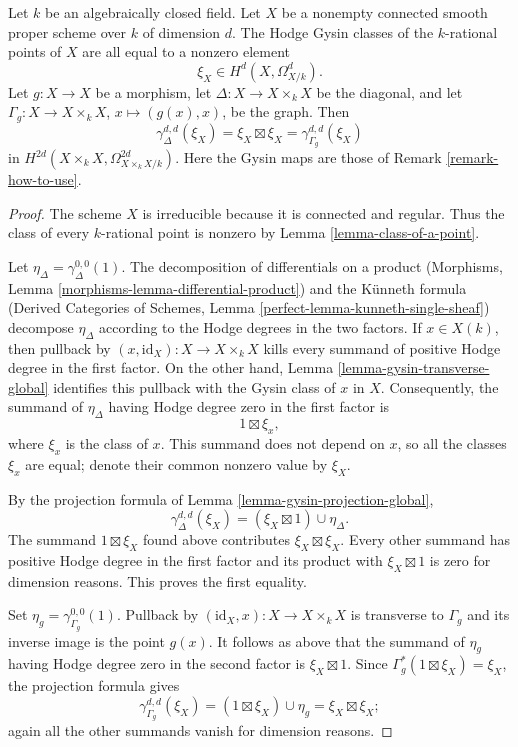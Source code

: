 \begin{lemma}
\label{lemma-hodge-classes-points-diagonal-graph}
Let $k$ be an algebraically closed field. Let $X$ be a nonempty connected
smooth proper scheme over $k$ of dimension $d$. The Hodge Gysin classes
of the $k$-rational points of $X$ are all equal to a nonzero element
$$
\xi_X \in H^d(X, \Omega^d_{X/k}).
$$
Let $g : X \to X$ be a morphism, let
$\Delta : X \to X \times_k X$ be the diagonal, and let
$\Gamma_g : X \to X \times_k X$, $x \mapsto (g(x), x)$, be the graph.
Then
$$
\gamma^{d, d}_\Delta(\xi_X) =
\xi_X \boxtimes \xi_X =
\gamma^{d, d}_{\Gamma_g}(\xi_X)
$$
in $H^{2d}(X \times_k X, \Omega^{2d}_{X \times_k X/k})$.
Here the Gysin maps are those of Remark \ref{remark-how-to-use}.
\end{lemma}

\begin{proof}
The scheme $X$ is irreducible because it is connected and regular. Thus
the class of every $k$-rational point is nonzero by
Lemma \ref{lemma-class-of-a-point}.

\medskip\noindent
Let $\eta_\Delta = \gamma^{0, 0}_\Delta(1)$. The decomposition of
differentials on a product
(Morphisms, Lemma \ref{morphisms-lemma-differential-product}) and the
K\"unneth formula (Derived Categories of Schemes, Lemma
\ref{perfect-lemma-kunneth-single-sheaf}) decompose $\eta_\Delta$ according
to the Hodge degrees in the two factors. If $x \in X(k)$, then
pullback by $(x, \text{id}_X) : X \to X \times_k X$ kills every summand
of positive Hodge degree in the first factor. On the other hand,
Lemma \ref{lemma-gysin-transverse-global} identifies this pullback with
the Gysin class of $x$ in $X$. Consequently, the summand of
$\eta_\Delta$ having Hodge degree zero in the first factor is
$$
1 \boxtimes \xi_x,
$$
where $\xi_x$ is the class of $x$. This summand does not depend on $x$,
so all the classes $\xi_x$ are equal; denote their common nonzero value
by $\xi_X$.

\medskip\noindent
By the projection formula of
Lemma \ref{lemma-gysin-projection-global},
$$
\gamma^{d, d}_\Delta(\xi_X) =
(\xi_X \boxtimes 1) \cup \eta_\Delta.
$$
The summand $1 \boxtimes \xi_X$ found above contributes
$\xi_X \boxtimes \xi_X$. Every other summand has positive Hodge degree
in the first factor and its product with $\xi_X \boxtimes 1$ is zero
for dimension reasons. This proves the first equality.

\medskip\noindent
Set $\eta_g = \gamma^{0, 0}_{\Gamma_g}(1)$. Pullback by
$(\text{id}_X, x) : X \to X \times_k X$ is transverse to $\Gamma_g$
and its inverse image is the point $g(x)$. It follows as above that the
summand of $\eta_g$ having Hodge degree zero in the second factor is
$\xi_X \boxtimes 1$. Since
$\Gamma_g^*(1 \boxtimes \xi_X) = \xi_X$, the projection formula gives
$$
\gamma^{d, d}_{\Gamma_g}(\xi_X) =
(1 \boxtimes \xi_X) \cup \eta_g =
\xi_X \boxtimes \xi_X;
$$
again all the other summands vanish for dimension reasons.
\end{proof}

